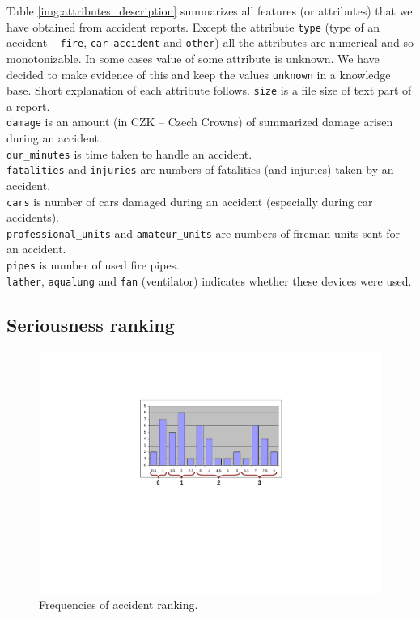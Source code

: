 \documentclass[authoryear,12pt]{elsarticle}
\begin{document}

Table \ref{img:attributes_description} summarizes all features (or attributes) that we have obtained from accident reports. Except the attribute \verb+type+ (type of an accident -- \verb+fire+, \verb+car_accident+ and \verb+other+) all the attributes are numerical and so monotonizable. In some cases value of some attribute is unknown. We have decided to make evidence of this and keep the values \verb+unknown+ in a knowledge base. Short explanation of each attribute follows.
\newline
\verb+size+ is a file size of text part of a report.\\
	\verb+damage+ is an amount (in CZK -- Czech Crowns) of summarized damage arisen during an accident.\\
	\verb+dur_minutes+ is time taken to handle an accident.\\
	\verb+fatalities+ and \verb+injuries+ are numbers of fatalities (and injuries) taken by an accident.\\
	\verb+cars+ is number of cars damaged during an accident (especially during car accidents).\\
	\verb+professional_units+ and \verb+amateur_units+ are numbers of fireman units sent for an accident.\\
	\verb+pipes+ is number of  used fire pipes.\\
	\verb+lather+, \verb+aqualung+ and \verb+fan+ (ventilator) indicates whether these devices were used.


\subsection{Seriousness ranking} \label{sec:seriousness}


\begin{figure}
\centerline{\includegraphics[width=0.7\hsize]{img/ranking_histogram}}
\caption{Frequencies of accident ranking.}
\label{img:ranking_histogram}
\end{figure}
\end{document}
